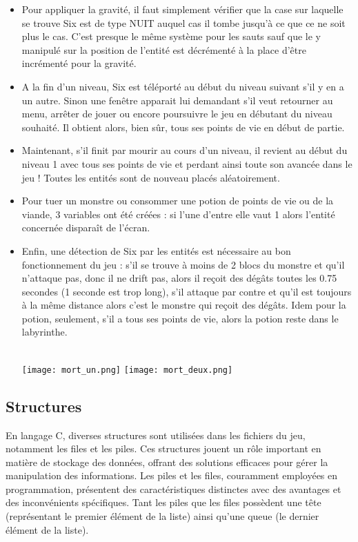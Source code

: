 \documentclass[10pt]{article}
\begin{document}
\begin{itemize}
   \item Pour appliquer la gravité, il faut simplement vérifier que la case sur laquelle se trouve Six est de type NUIT auquel cas il tombe jusqu'à ce que ce ne soit plus le cas. C'est presque le même système pour les sauts sauf que le y manipulé sur la position de l'entité est décrémenté à la place d'être incrémenté pour la gravité.\\
   \item A la fin d'un niveau, Six est téléporté au début du niveau suivant s'il y en a un autre. Sinon une fenêtre apparait lui demandant s'il veut retourner au menu, arrêter de jouer ou encore poursuivre le jeu en débutant du niveau souhaité. Il obtient alors, bien sûr, tous ses points de vie en début de partie.\\
   \item Maintenant, s'il finit par mourir au cours d'un niveau, il revient au début du niveau 1 avec tous ses points de vie et perdant ainsi toute son avancée dans le jeu ! Toutes les entités sont de nouveau placés aléatoirement.\\
   \item Pour tuer un monstre ou consommer une potion de points de vie ou de la viande, 3 variables ont été créées : si l'une d'entre elle vaut 1 alors l'entité concernée disparaît de l'écran.\\
   \item Enfin, une détection de Six par les entités est nécessaire au bon fonctionnement du jeu : s'il se trouve à moins de 2 blocs du monstre et qu'il n'attaque pas, donc il ne drift pas, alors il reçoit des dégâts toutes les 0.75 secondes (1 seconde est trop long), s'il attaque par contre et qu'il est toujours à la même distance alors c'est le monstre qui reçoit des dégâts. Idem pour la potion, seulement, s'il a tous ses points de vie, alors la potion reste dans le labyrinthe.\\\\
   \begin{center}
        \texttt{[image: mort\_un.png]}
        \texttt{[image: mort\_deux.png]}
        \label{fig13}\\
    \end{center}
   \end{itemize}
\clearpage
   \subsection{Structures}

En langage C, diverses \gls{structures} sont utilisées dans les fichiers du jeu, notamment les files et les piles. Ces structures jouent un rôle important en matière de stockage des données, offrant des solutions efficaces pour gérer la manipulation des informations. Les piles et les files, couramment employées en programmation, présentent des caractéristiques distinctes avec des avantages et des inconvénients spécifiques. Tant les piles que les files possèdent une tête (représentant le premier élément de la liste) ainsi qu'une queue (le dernier élément de la liste).\\
\end{document}

